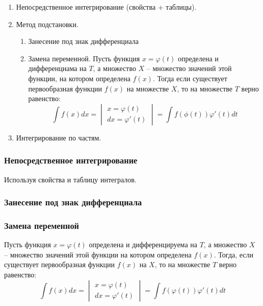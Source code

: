 \begin{enumerate}
    \item Непосредственное интегрирование (свойства + таблицы).
    \item Метод подстановки.
    \begin{enumerate}
        \item Занесение под знак дифференциала
        \item Замена переменной.
            Пусть функция $x = \varphi(t)$ определена и дифференциама на $T$,  а множество $X$ -- множество значений этой функции, на котором определена $f(x)$. Тогда если существует первообразная функции $f(x)$ на множестве $X$, то на множестве $T$ верно равенство: \[
                \int f(x) dx = \begin{vmatrix}
                    x = \varphi(t) \\
                    dx = \varphi'(t)
                \end{vmatrix} = \int f(\phi(t)) \varphi'(t) dt
            \]
    \end{enumerate}
    \item Интегрирование по частям.
\end{enumerate}

\subsubsection{Непосредственное интегрирование}

Используя свойства и таблицу интегралов.

\subsubsection{Занесение под знак дифференциала}

\subsubsection{Замена переменной}

Пусть функция $x = \varphi(t)$ определена и дифференцируема на $T$, а множество  $X$ -- множество значений этой функции на котором определена $f(x)$.
Тогда, если существует первообразная функции  $f(x)$ на $X$, то на множестве $T$ верно равенство:  \[
  \int f(x)dx =
  \begin{vmatrix} 
    x = \varphi(t) \\
    dx = \varphi'(t)
  \end{vmatrix} = \int f(\varphi(t)) \varphi'(t) dt
\] 

